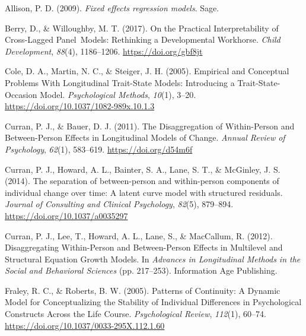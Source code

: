 \documentclass[
  english,
  man,floatsintext]{apa6}
\newlength{\cslhangindent}
\newlength{\cslentryspacingunit} %
\newenvironment{CSLReferences}[2] %
 {%
  \setlength{\parindent}{0pt}
  \ifodd #1
  \let\oldpar\par
  \def\par{\hangindent=\cslhangindent\oldpar}
  \fi
  \setlength{\parskip}{#2\cslentryspacingunit}
 }%
 {}
\begin{document}
\hypertarget{refs}{}
\begin{CSLReferences}{1}{0}
\leavevmode{}%
Allison, P. D. (2009). \emph{Fixed effects regression models}. {Sage}.

\leavevmode{}%
Berry, D., \& Willoughby, M. T. (2017). On the {Practical Interpretability} of {Cross-Lagged Panel~Models}: {Rethinking} a {Developmental Workhorse}. \emph{Child Development}, \emph{88}(4), 1186--1206. \url{https://doi.org/gbf8jt}

\leavevmode{}%
Cole, D. A., Martin, N. C., \& Steiger, J. H. (2005). Empirical and {Conceptual Problems With Longitudinal Trait-State Models}: {Introducing} a {Trait-State-Occasion Model}. \emph{Psychological Methods}, \emph{10}(1), 3--20. \url{https://doi.org/10.1037/1082-989x.10.1.3}

\leavevmode{}%
Curran, P. J., \& Bauer, D. J. (2011). The {Disaggregation} of {Within-Person} and {Between-Person Effects} in {Longitudinal Models} of {Change}. \emph{Annual Review of Psychology}, \emph{62}(1), 583--619. \url{https://doi.org/d54m6f}

\leavevmode{}%
Curran, P. J., Howard, A. L., Bainter, S. A., Lane, S. T., \& McGinley, J. S. (2014). The separation of between-person and within-person components of individual change over time: {A} latent curve model with structured residuals. \emph{Journal of Consulting and Clinical Psychology}, \emph{82}(5), 879--894. \url{https://doi.org/10.1037/a0035297}

\leavevmode{}%
Curran, P. J., Lee, T., Howard, A. L., Lane, S., \& MacCallum, R. (2012). Disaggregating {Within-Person} and {Between-Person Effects} in {Multilevel} and {Structural Equation Growth Models}. In \emph{Advances in {Longitudinal Methods} in the {Social} and {Behavioral Sciences}} (pp. 217--253). {Information Age Publishing}.

\leavevmode{}%
Fraley, R. C., \& Roberts, B. W. (2005). Patterns of {Continuity}: {A Dynamic Model} for {Conceptualizing} the {Stability} of {Individual Differences} in {Psychological Constructs Across} the {Life Course}. \emph{Psychological Review}, \emph{112}(1), 60--74. \url{https://doi.org/10.1037/0033-295X.112.1.60}


\end{CSLReferences}
\end{document}
